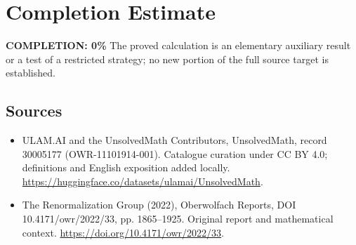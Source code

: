 \documentclass[11pt]{article}
\begin{document}
\section{Completion Estimate}
\noindent\textbf{COMPLETION: 0\%}
The proved calculation is an elementary auxiliary result or a test of a restricted strategy; no new portion of the full source target is established.

\subsection{Sources}
\begin{itemize}
\item[\hypertarget{source:30005177:1}{S1}] ULAM.AI and the UnsolvedMath Contributors, UnsolvedMath, record 30005177 (OWR-11101914-001). Catalogue curation under CC BY 4.0; definitions and English exposition added locally.
\url{https://huggingface.co/datasets/ulamai/UnsolvedMath}.
\item[\hypertarget{source:30005177:2}{S2}] The Renormalization Group (2022), Oberwolfach Reports, DOI 10.4171/owr/2022/33, pp. 1865--1925. Original report and mathematical context.
\url{https://doi.org/10.4171/owr/2022/33}.
\end{itemize}
\label{end:30005177}
\end{document}
